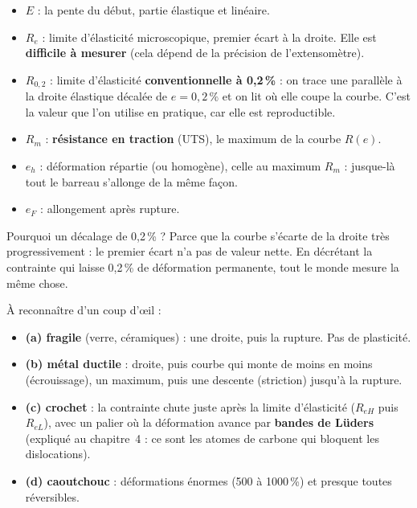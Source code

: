 
\begin{defnbox}[title=Les grandeurs de la courbe conventionnelle]
\begin{itemize}
  \item $E$ : la pente du début, partie élastique et linéaire.
  \item $R_e$ : limite d'élasticité \og microscopique\fg{}, premier écart à la droite. Elle
        est \textbf{difficile à mesurer} (cela dépend de la précision de l'extensomètre).
  \item $R_{0,2}$ : limite d'élasticité \textbf{conventionnelle à 0,2\,\%} : on trace une
        parallèle à la droite élastique décalée de $e = 0{,}2\,\%$ et on lit où elle coupe la
        courbe. C'est la valeur que l'on utilise en pratique, car elle est reproductible.
  \item $R_m$ : \textbf{résistance en traction} (UTS), le maximum de la courbe $R(e)$.
  \item $e_h$ : déformation répartie (ou homogène), celle au maximum $R_m$ : jusque-là tout
        le barreau s'allonge de la même façon.
  \item $e_F$ : allongement après rupture.
\end{itemize}
\end{defnbox}

Pourquoi un décalage de 0,2\,\% ? Parce que la courbe s'écarte de la droite très
progressivement : \og le premier écart\fg{} n'a pas de valeur nette. En décrétant
\og la contrainte qui laisse 0,2\,\% de déformation permanente\fg{}, tout le monde mesure la même
chose.


À reconnaître d'un coup d'\oe il :
\begin{itemize}
  \item \textbf{(a) fragile} (verre, céramiques) : une droite, puis la rupture. Pas de
        plasticité.
  \item \textbf{(b) métal ductile} : droite, puis courbe qui monte de moins en moins
        (écrouissage), un maximum, puis une descente (striction) jusqu'à la rupture.
  \item \textbf{(c) crochet} : la contrainte chute juste après la limite d'élasticité
        ($R_{eH}$ puis $R_{eL}$), avec un palier où la déformation avance par
        \textbf{bandes de Lüders} (expliqué au chapitre~4 : ce sont les atomes de carbone qui
        bloquent les dislocations).
  \item \textbf{(d) caoutchouc} : déformations énormes (500 à 1000\,\%) et presque toutes
        réversibles.
\end{itemize}

